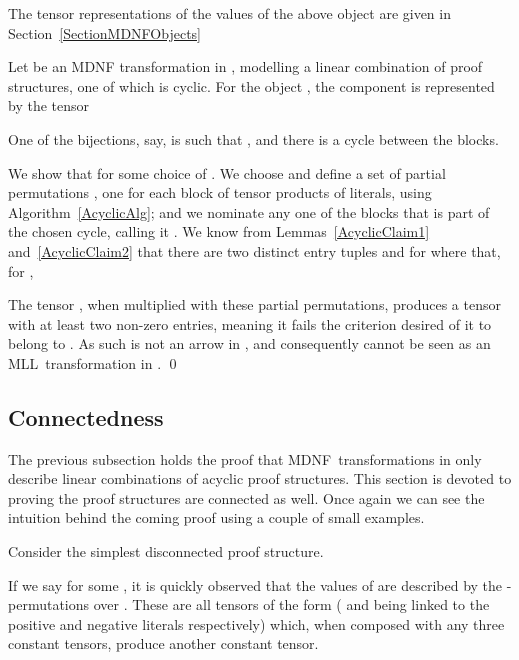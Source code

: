 \documentclass{LMCS}
\theoremstyle{plain}\newtheorem*{cLm}{Claim}
\newcommand{\mll}{MLL} \newcommand{\mall}{MALL}
\newcommand{\p}{} \newcommand{\N}{\mathbb{N}}
\newcommand{\hughf}[1]{#1}
\begin{document}
  The tensor representations of the values of the above object are
  given in Section~\ref{SectionMDNFObjects}

  Let 
  be an MDNF transformation in , modelling a linear combination
  of proof structures, one of which is cyclic. For the object
  , the component 
  is represented by the tensor
  
  One of the bijections,  say, is such that , and there is a cycle between the blocks.

  We show that  for some choice of
  . We choose  and define a set of partial
  permutations , one for each block of tensor
  products of literals, using Algorithm~\ref{AcyclicAlg}; and we
  nominate any one of the blocks that is part of the chosen cycle,
  calling it . We know from Lemmas~\ref{AcyclicClaim1} and~\ref{AcyclicClaim2} that there are two distinct entry tuples
   and  for  where
   that, for , 
  
  The tensor , when multiplied with
    these partial permutations, produces a tensor with at least two
    non-zero entries, meaning it fails the criterion desired of it to
    belong to . As such
     is not an arrow in
    , and consequently
     cannot be seen as an \mll\ transformation in . \qed
  
  \subsection{Connectedness} \label{SubsectionConnectedness}
  
  The previous subsection holds the proof that MDNF~transformations in  only describe linear combinations of acyclic proof structures. This section is devoted to proving the proof structures are connected as well. Once again we can see the intuition behind the coming proof using a couple of small examples.
  
  \p Consider the simplest \hughf{disconnected} proof structure.
  \begin{center} \vspace{5mm}
   \vspace{5mm}
  \end{center}
If we say  for some , it is quickly observed that the values of \linebreak  are described by the -permutations over . These are all tensors of the form  ( and  being linked to the  positive and negative literals respectively) which, when composed with any three constant tensors, produce another constant tensor.
  
\end{document}
